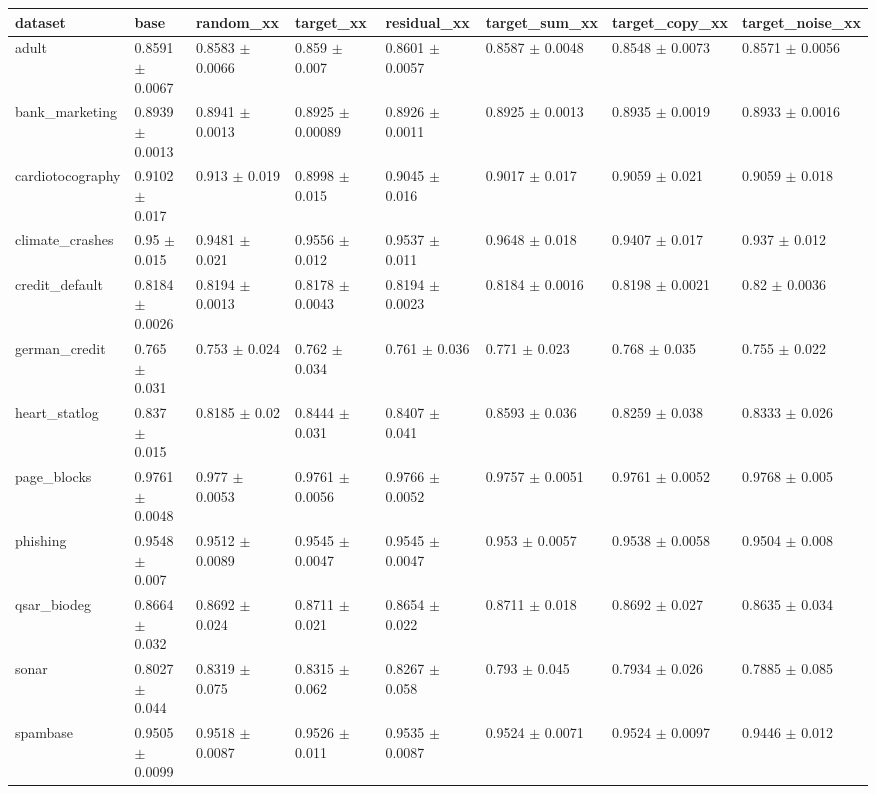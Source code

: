 \begin{tabular}{llllllll}
\toprule
dataset & base & random\_xx & target\_xx & residual\_xx & target\_sum\_xx & target\_copy\_xx & target\_noise\_xx \\
\midrule
adult & 0.8591 $\pm$ 0.0067 & 0.8583 $\pm$ 0.0066 & 0.859 $\pm$ 0.007 & 0.8601 $\pm$ 0.0057 & 0.8587 $\pm$ 0.0048 & 0.8548 $\pm$ 0.0073 & 0.8571 $\pm$ 0.0056 \\
bank\_marketing & 0.8939 $\pm$ 0.0013 & 0.8941 $\pm$ 0.0013 & 0.8925 $\pm$ 0.00089 & 0.8926 $\pm$ 0.0011 & 0.8925 $\pm$ 0.0013 & 0.8935 $\pm$ 0.0019 & 0.8933 $\pm$ 0.0016 \\
cardiotocography & 0.9102 $\pm$ 0.017 & 0.913 $\pm$ 0.019 & 0.8998 $\pm$ 0.015 & 0.9045 $\pm$ 0.016 & 0.9017 $\pm$ 0.017 & 0.9059 $\pm$ 0.021 & 0.9059 $\pm$ 0.018 \\
climate\_crashes & 0.95 $\pm$ 0.015 & 0.9481 $\pm$ 0.021 & 0.9556 $\pm$ 0.012 & 0.9537 $\pm$ 0.011 & 0.9648 $\pm$ 0.018 & 0.9407 $\pm$ 0.017 & 0.937 $\pm$ 0.012 \\
credit\_default & 0.8184 $\pm$ 0.0026 & 0.8194 $\pm$ 0.0013 & 0.8178 $\pm$ 0.0043 & 0.8194 $\pm$ 0.0023 & 0.8184 $\pm$ 0.0016 & 0.8198 $\pm$ 0.0021 & 0.82 $\pm$ 0.0036 \\
german\_credit & 0.765 $\pm$ 0.031 & 0.753 $\pm$ 0.024 & 0.762 $\pm$ 0.034 & 0.761 $\pm$ 0.036 & 0.771 $\pm$ 0.023 & 0.768 $\pm$ 0.035 & 0.755 $\pm$ 0.022 \\
heart\_statlog & 0.837 $\pm$ 0.015 & 0.8185 $\pm$ 0.02 & 0.8444 $\pm$ 0.031 & 0.8407 $\pm$ 0.041 & 0.8593 $\pm$ 0.036 & 0.8259 $\pm$ 0.038 & 0.8333 $\pm$ 0.026 \\
page\_blocks & 0.9761 $\pm$ 0.0048 & 0.977 $\pm$ 0.0053 & 0.9761 $\pm$ 0.0056 & 0.9766 $\pm$ 0.0052 & 0.9757 $\pm$ 0.0051 & 0.9761 $\pm$ 0.0052 & 0.9768 $\pm$ 0.005 \\
phishing & 0.9548 $\pm$ 0.007 & 0.9512 $\pm$ 0.0089 & 0.9545 $\pm$ 0.0047 & 0.9545 $\pm$ 0.0047 & 0.953 $\pm$ 0.0057 & 0.9538 $\pm$ 0.0058 & 0.9504 $\pm$ 0.008 \\
qsar\_biodeg & 0.8664 $\pm$ 0.032 & 0.8692 $\pm$ 0.024 & 0.8711 $\pm$ 0.021 & 0.8654 $\pm$ 0.022 & 0.8711 $\pm$ 0.018 & 0.8692 $\pm$ 0.027 & 0.8635 $\pm$ 0.034 \\
sonar & 0.8027 $\pm$ 0.044 & 0.8319 $\pm$ 0.075 & 0.8315 $\pm$ 0.062 & 0.8267 $\pm$ 0.058 & 0.793 $\pm$ 0.045 & 0.7934 $\pm$ 0.026 & 0.7885 $\pm$ 0.085 \\
spambase & 0.9505 $\pm$ 0.0099 & 0.9518 $\pm$ 0.0087 & 0.9526 $\pm$ 0.011 & 0.9535 $\pm$ 0.0087 & 0.9524 $\pm$ 0.0071 & 0.9524 $\pm$ 0.0097 & 0.9446 $\pm$ 0.012 \\

\end{tabular}
